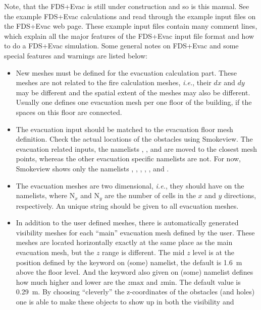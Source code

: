 \documentclass[12pt,a4paper,final,twoside]{stylevk}
\begin{document}
Note, that the FDS+Evac is still under construction and so is this
manual.  See the example FDS+Evac calculations and read through the
example input files on the FDS+Evac web page.  These example input
files contain many comment lines, which explain all the major features
of the FDS+Evac input file format and how to do a FDS+Evac simulation.
Some general notes on FDS+Evac and some special features and warnings
are listed below:
%
\begin{itemize}
%
\item New meshes must be defined for the evacuation calculation part.
  These meshes are not related to the fire calculation meshes,
  \emph{i.e.}, their $dx$ and $dy$ may be different and the spatial
  extent of the meshes may also be different.  Usually one defines one
  evacuation mesh per one floor of the building, if the spaces on this
  floor are connected. 
%
\item The evacuation input should be matched to the evacuation floor
  mesh definition.  Check the actual locations of the obstacles using
  Smokeview.  The evacuation related inputs, the namelists
  , , and  are moved to the
  closest mesh points, whereas the other evacuation specific namelists
  are not.  For now, Smokeview shows only the namelists ,
  , , , , and
  .
%
\item The evacuation meshes are two dimensional, \emph{i.e.}, they
  should have  on the 
  namelists, where N${}_x$ and N${}_y$ are the number of cells in the
  $x$ and $y$ directions, respectively.  An unique  string
  should be given to all evacuation meshes.
%
\item In addition to the user defined meshes, there is automatically
  generated visibility meshes for each ``main'' evacuation mesh
  defined by the user.  These meshes are located horizontally exactly
  at the same place as the main evacuation mesh, but the $z$ range is
  different. The mid $z$ level is at the  position defined by the
  keyword  on (some) 
  namelist, the default is 1.6~m above the floor level. And the
  keyword  also given on (some) 
  namelist defines how much higher and lower are the $z\mathrm{max}$
  and $z\mathrm{min}$.  The default value is 0.29~m.  By choosing
  ``cleverly'' the z-coordinates of the obstacles (and holes) one is
  able to make these objects to show up in both the visibility and

\end{itemize}
\end{document}
